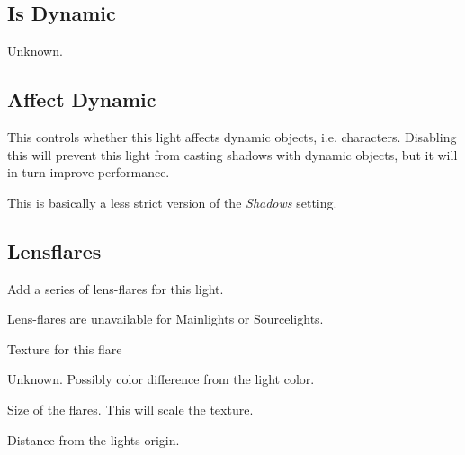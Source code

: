 \subsection*{Is Dynamic}
Unknown.

\subsection*{Affect Dynamic}
This controls whether this light affects dynamic objects, i.e. characters.
Disabling this will prevent this light from casting shadows with dynamic
objects, but it will in turn improve performance.

This is basically a less strict version of the \textit{Shadows} setting.

\subsection*{Lensflares}
Add a series of lens-flares for this light.

Lens-flares are unavailable for Mainlights or Sourcelights.
\begin{description}[leftmargin=6em,style=nextline]
    \item[Texture] Texture for this flare
    \item[Colorshift] Unknown. Possibly color difference from the light color.
    \item[Size] Size of the flares. This will scale the texture.
    \item[Position] Distance from the lights origin.
\end{description}
